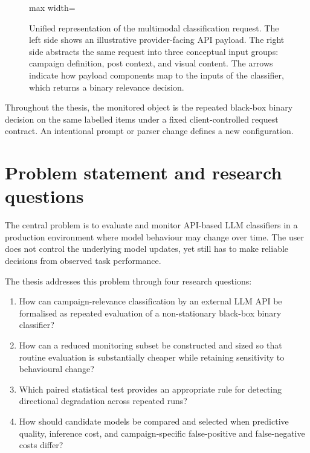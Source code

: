 \begin{figure}[H]
\begin{adjustbox}{max width=\linewidth}
\end{adjustbox}
\caption[Unified representation of the multimodal classification request]{Unified representation of the multimodal classification request. The left side shows an illustrative provider-facing API payload. The right side abstracts the same request into three conceptual input groups: campaign definition, post context, and visual content. The arrows indicate how payload components map to the inputs of the classifier, which returns a binary relevance decision.}
\label{fig:payload-unified}
\end{figure}

Throughout the thesis, the monitored object is the repeated black-box binary decision on the same labelled items under a fixed client-controlled request contract. An intentional prompt or parser change defines a new configuration.

\section{Problem statement and research questions}
The central problem is to evaluate and monitor API-based LLM classifiers in a production environment where model behaviour may change over time. The user does not control the underlying model updates, yet still has to make reliable decisions from observed task performance.

The thesis addresses this problem through four research questions:
\begin{enumerate}
    \item[RQ1:] How can campaign-relevance classification by an external LLM API be formalised as repeated evaluation of a non-stationary black-box binary classifier?
    \item[RQ2:] How can a reduced monitoring subset be constructed and sized so that routine evaluation is substantially cheaper while retaining sensitivity to behavioural change?
    \item[RQ3:] Which paired statistical test provides an appropriate rule for detecting directional degradation across repeated runs?
    \item[RQ4:] How should candidate models be compared and selected when predictive quality, inference cost, and campaign-specific false-positive and false-negative costs differ?
\end{enumerate}

